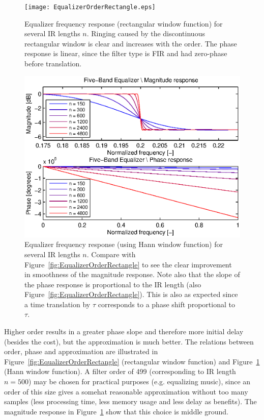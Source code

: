 \newpage
\begin{figure}[H]
\center
\texttt{[image: EqualizerOrderRectangle.eps]}%
\caption{Equalizer frequency response (rectangular window function) for several IR lengths $n$. Ringing caused by the discontinuous rectangular window is clear and increases with the order. The phase response is linear, since the filter type is FIR and had zero-phase before translation.}
\label{fig:EqualizerOrderRectangle}
\includegraphics[scale=1]{./picture/EqualizerOrderHanning.eps}%
\caption{Equalizer frequency response (using Hann window function) for several IR lengths $n$. Compare with Figure~\ref{fig:EqualizerOrderRectangle} to see the clear improvement in smoothness of the magnitude response. Note also that the slope of the phase response is proportional to the IR length (also Figure~\ref{fig:EqualizerOrderRectangle}). This is also as expected since a time translation by $\tau$ corresponds to a phase shift proportional to $\tau$.}
\label{fig:EqualizerOrderHanning}
\end{figure}

\newpage
\noindent Higher order results in a greater phase slope and therefore more initial delay (besides the cost), but the approximation is much better. The relations between order, phase and approximation are illustrated in Figure~\ref{fig:EqualizerOrderRectangle} (rectangular window function) and Figure~\ref{fig:EqualizerOrderHanning} (Hann window function). A filter order of 499 (corresponding to IR length $n=500$) may be chosen for practical purposes (e.g. equalizing music), since an order of this size gives a somehat reasonable approximation without too many samples (less processing time, less memory usage and less delay as benefits). The magnitude response in Figure~\ref{fig:EqualizerOrderHanning} show that this choice is middle ground.\\

